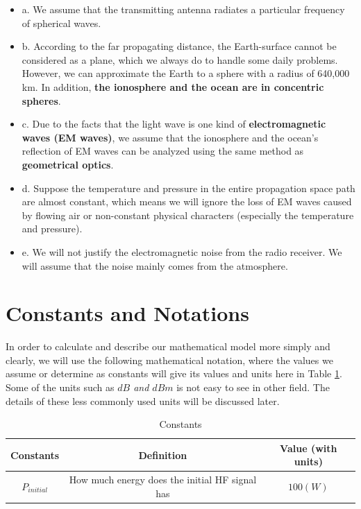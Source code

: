 \documentclass{mcmthesis}
\begin{document}
    \begin{itemize}

      \item a. We assume that the transmitting antenna radiates a particular frequency of spherical waves.

      \item b. According to the far propagating distance, the Earth-surface cannot be considered as a plane, which we always do to handle some daily problems. However, we can approximate the Earth  to a sphere with a radius of 640,000 km. In addition, \textbf{the ionosphere and the ocean are in concentric spheres}.

      \item c. Due to the facts that the light wave is one kind of \textbf{electromagnetic waves (EM waves)}, we assume that the ionosphere and the ocean's reflection of EM waves can be analyzed using the same method as \textbf{geometrical optics}.

      \item d. Suppose the temperature and pressure in the entire propagation space path are almost constant, which means we will ignore the loss of EM waves caused by flowing air or non-constant physical characters (especially the temperature and pressure).

      \item e. We will not justify the electromagnetic noise from the radio receiver. We will assume that the noise mainly comes from the atmosphere.

    \end{itemize}

\section{Constants and Notations}

    In order to calculate and describe our mathematical model more simply and clearly, we will use the following mathematical notation, where the values we assume or determine as constants will give its values and units here in Table \ref{tab:Constants}. Some of the units such as \emph{$dB$ and $dBm$} is not easy to see in other field. The details of these less commonly used units will be discussed later.

    \begin{table}[h]
      \centering
        \begin{tabular}{|c|c|c|}

          \hline Constants & Definition & Value (with units) \\
          \hline $P_{initial}$ & How much energy does the initial HF signal has & $100(W)$ \\
          \hline

        \end{tabular}
        \caption{Constants}
        \label{tab:Constants}
    \end{table}
\end{document}
